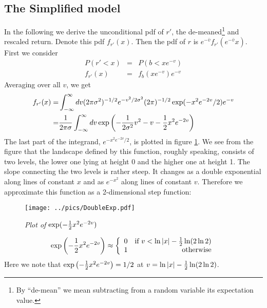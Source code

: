 \subsection{The Simplified model}\label{sec:SLV_Symmetric}
In the following we derive the unconditional \gls{pdf} of $r'$, the
de-meaned\footnote{By ``de-mean'' we mean subtracting from
  a random variable its expectation value.} and rescaled
return. Denote this \gls{pdf} $f_{r'}(x)$. Then the \gls{pdf} of $r$ is
$e^{-\bar{v}}f_{r'}(e^{-\bar{v}}x)$. First we consider
\begin{eqnarray*}
  P(r' < x) &=& P(b < xe^{-v}) \\
  f_{r'}(x) &=& f_b(xe^{-v}) e^{-v}
\end{eqnarray*}
Averaging over all $v$, we get
\begin{equation}\label{eq:UncondPDFSymmetric}
  \begin{aligned}
    f_{r'}(x) =& \int_{-\infty}^{\infty} dv (2\pi\sigma^2)^{-1/2}
    e^{-v^2/2\sigma^2}(2\pi)^{-1/2} \exp(-x^2e^{-2v}/2) e^{-v} \\
    =& {1 \over 2\pi\sigma} \int_{-\infty}^{\infty} dv
    \exp\left(
      -{1 \over 2\sigma^2} v^2 - v -{1 \over 2} x^2 e^{-2v}
    \right)
  \end{aligned}
  \end{equation}
The last part of the integrand, $e^{-x^2 e^{-2v} / 2}$, is plotted in
figure \ref{fig:DoubleExp}. We see from the figure that the landscape
defined by this function, roughly speaking, consists of two levels,
the lower one lying at height 0 and the higher one at height 1. The
slope connecting the two levels is rather steep. It changes as a
double exponential along lines of constant $x$ and as $e^{-x^2}$ along
lines of constant $v$. Therefore we approximate this function as a
2-dimensional step function:
\begin{figure}[htb!]
  \centering
  \texttt{[image: ../pics/DoubleExp.pdf]}
  \caption{\small \it Plot of $\exp(-{1 \over 2} x^2 e^{-2v})$}
  \label{fig:DoubleExp}
\end{figure}
\[
\exp\left(-{1 \over 2} x^2 e^{-2v}\right) \approx \left\{
  \begin{array}{lr}
    0 & \text{if } v < \ln|x| -{1 \over 2} \ln(2\ln 2) \\
    1 & \text{otherwise}
  \end{array}
\right.
\]
Here we note that $\exp\left(-{1 \over 2} x^2 e^{-2v}\right) = 1/2$ at
$v = \ln|x| -{1 \over 2} \ln(2\ln 2)$.

